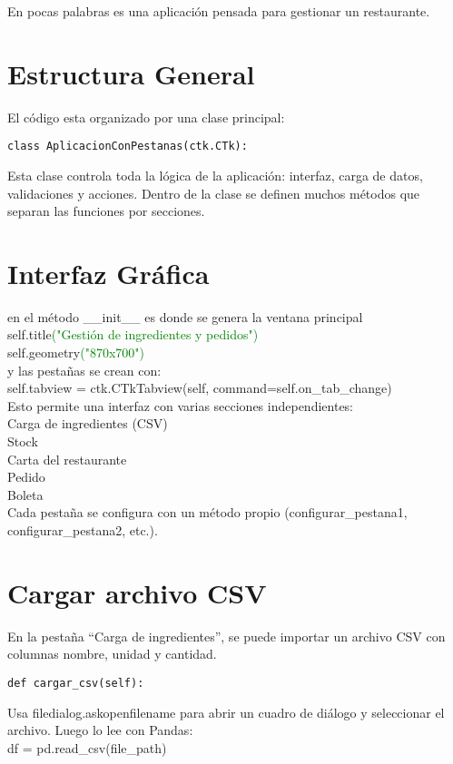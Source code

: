 \documentclass{article}
\begin{document}
En pocas palabras es una aplicación pensada para gestionar un restaurante.
\section{Estructura General}
El código esta organizado por una clase principal:\\
\begin{verbatim}
class AplicacionConPestanas(ctk.CTk):
\end{verbatim}
Esta clase controla toda la lógica de la aplicación: interfaz, carga de datos, validaciones y acciones.
Dentro de la clase se definen muchos métodos que separan las funciones por secciones.
\section{Interfaz Gráfica}
en el método \_\_init\_\_ es donde se genera la ventana principal\\
self.title\textcolor{green}{("Gestión de ingredientes y pedidos")}\\
self.geometry\textcolor{green}{("870x700")}\\

y las pestañas se crean con:\\
self.tabview = ctk.CTkTabview(self, command=self.on_tab_change)\\

Esto permite una interfaz con varias secciones independientes:\\
Carga de ingredientes (CSV)\\
Stock\\
Carta del restaurante\\
Pedido\\
Boleta\\
Cada pestaña se configura con un método propio (configurar\_pestana1, configurar\_pestana2, etc.).

\section{Cargar archivo CSV}
En la pestaña “Carga de ingredientes”, se puede importar un archivo CSV con columnas nombre, unidad y cantidad.
\begin{verbatim}
def cargar_csv(self):
\end{verbatim}
Usa filedialog.askopenfilename para abrir un cuadro de diálogo y seleccionar el archivo.
Luego lo lee con Pandas:\\
df = pd.read_csv(file_path)\\
\end{document}
